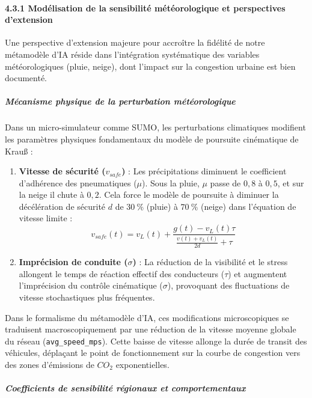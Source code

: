 \documentclass[10pt, a4paper]{article}
\providecommand{\tightlist}{}
\begin{document}
\paragraph{4.3.1 Modélisation de la sensibilité météorologique et
perspectives
d'extension}\label{moduxe9lisation-de-la-sensibilituxe9-muxe9tuxe9orologique-et-perspectives-dextension}

Une perspective d'extension majeure pour accroître la fidélité de notre
métamodèle d'IA réside dans l'intégration systématique des variables
météorologiques (pluie, neige), dont l'impact sur la congestion urbaine
est bien documenté.

\subparagraph{Mécanisme physique de la perturbation
météorologique}\label{muxe9canisme-physique-de-la-perturbation-muxe9tuxe9orologique}

Dans un micro-simulateur comme SUMO, les perturbations climatiques
modifient les paramètres physiques fondamentaux du modèle de poursuite
cinématique de Krauß :

\begin{enumerate}
\def\labelenumi{\arabic{enumi}.}
\tightlist
\item
  \textbf{Vitesse de sécurité (\(v_{safe}\))} : Les précipitations
  diminuent le coefficient d'adhérence des pneumatiques (\(\mu\)). Sous
  la pluie, \(\mu\) passe de \(0,8\) à \(0,5\), et sur la neige il chute
  à \(0,2\). Cela force le modèle de poursuite à diminuer la
  décélération de sécurité \(d\) de \(30\ \%\) (pluie) à \(70\ \%\)
  (neige) dans l'équation de vitesse limite :
  \[v_{safe}(t) = v_L(t) + \frac{g(t) - v_L(t)\tau}{\frac{v(t) + v_L(t)}{2d} + \tau}\]
\item
  \textbf{Imprécision de conduite (\(\sigma\))} : La réduction de la
  visibilité et le stress allongent le temps de réaction effectif des
  conducteurs (\(\tau\)) et augmentent l'imprécision du contrôle
  cinématique (\(\sigma\)), provoquant des fluctuations de vitesse
  stochastiques plus fréquentes.
\end{enumerate}

Dans le formalisme du métamodèle d'IA, ces modifications microscopiques
se traduisent macroscopiquement par une réduction de la vitesse moyenne
globale du réseau (\texttt{avg\_speed\_mps}). Cette baisse de vitesse
allonge la durée de transit des véhicules, déplaçant le point de
fonctionnement sur la courbe de congestion vers des zones d'émissions de
\(CO_2\) exponentielles.

\subparagraph{Coefficients de sensibilité régionaux et
comportementaux}\label{coefficients-de-sensibilituxe9-ruxe9gionaux-et-comportementaux}
\end{document}
